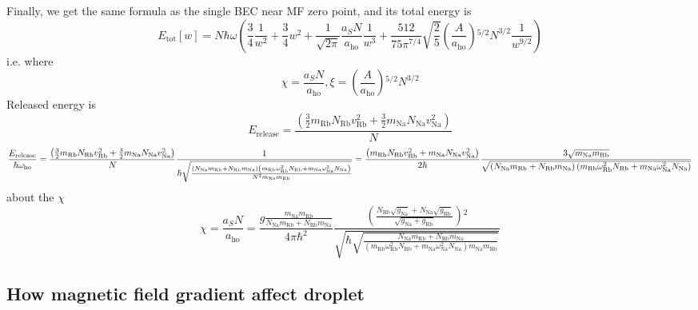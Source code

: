 Finally, we get the same formula as the single BEC near MF zero point, and its total energy is
\begin{equation}
E_{\text{tot}}[w]=N \hbar  \omega  \left(\frac{3}{4}\frac{1}{w^2}+\frac{3}{4}w^2+\frac{1}{\sqrt{2\pi }}\frac{a_SN}{a_{\text{ho}}}\frac{1}{w^3}+\frac{512}{75 \pi^{7/4}}\sqrt{\frac{2}{5}}\left(\frac{A}{a_{\text{ho}}}\right){}^{5/2}N^{3/2}\frac{1}{ w^{9/2}}\right)
\end{equation}
i.e. where
\begin{equation}
\chi =\frac{a_SN}{a_{\text{ho}}}, \xi =\left(\frac{A}{a_{\text{ho}}}\right){}^{5/2}N^{3/2}
\end{equation}
Released energy is
\begin{equation}
E_{\text{release}}=\frac{\left(\frac{3}{2}m_{\text{Rb}}N_{\text{Rb}}v_{\text{Rb}}^2+\frac{3}{2}m_{\text{Na}}N_{\text{Na}}v_{\text{Na}}^2\right)}{N}
\end{equation}
\begin{equation}
\frac{E_{\text{release}}}{\hbar  \omega _{\text{ho}}}=\\
\frac{\left(\frac{3}{2}m_{\text{Rb}}N_{\text{Rb}}v_{\text{Rb}}^2+\frac{3}{2}m_{\text{Na}}N_{\text{Na}}v_{\text{Na}}^2\right)}{N}\frac{1}{\hbar \sqrt{\frac{\left(N_{\text{Na}}m_{\text{Rb}}+N_{\text{Rb}}m_{\text{Na}}\right)\left(m_{\text{Rb}}
\omega _{\text{Rb}}^2N_{\text{Rb}}+m_{\text{Na}} \omega _{\text{Na}}^2N_{\text{Na}}\right)}{N^2m_{\text{Na}}m_{\text{Rb}}}}}=\frac{\left(m_{\text{Rb}}N_{\text{Rb}}v_{\text{Rb}}^2+m_{\text{Na}}N_{\text{Na}}v_{\text{Na}}^2\right)}{2\hbar
}\frac{3\sqrt{m_{\text{Na}}m_{\text{Rb}}}}{\sqrt{\left(N_{\text{Na}}m_{\text{Rb}}+N_{\text{Rb}}m_{\text{Na}}\right)\left(m_{\text{Rb}} \omega _{\text{Rb}}^2N_{\text{Rb}}+m_{\text{Na}}
\omega _{\text{Na}}^2N_{\text{Na}}\right)}}
\end{equation}
about the $\chi$
\begin{equation}\chi =\frac{a_SN}{a_{\text{ho}}}=\frac{g \frac{m_{\text{Na}}m_{\text{Rb}}}{N_{\text{Na}}m_{\text{Rb}}+N_{\text{Rb}}m_{\text{Na}}}}{4\pi  \hbar
^2}\frac{\left(\frac{N_{\text{Rb}}\sqrt{g_{\text{Na}}}+N_{\text{Na}}\sqrt{g_{\text{Rb}}}}{\sqrt{g_{\text{Na}}+g_{\text{Rb}}}}\right){}^2}{\sqrt{\hbar
\sqrt{\frac{N_{\text{Na}}m_{\text{Rb}}+N_{\text{Rb}}m_{\text{Na}}}{\left(m_{\text{Rb}} \omega _{\text{Rb}}^2N_{\text{Rb}}+m_{\text{Na}} \omega _{\text{Na}}^2N_{\text{Na}}\right)m_{\text{Na}}m_{\text{Rb}}}}}}
\end{equation}

\subsection*{How magnetic field gradient affect droplet}

